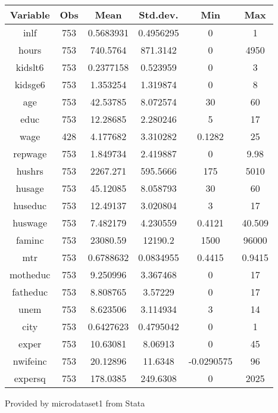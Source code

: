 \documentclass{article}
\begin{document}
\begin{Center}
	

	 \label{tab:title} 
	
	\begin{tabular}{|c |c |c |c |c |c |}
		\toprule
		Variable &Obs & Mean & Std.dev. & Min & Max \\ 
		\midrule
		inlf & 753 & 0.5683931 & 0.4956295 & 0 & 1\\
		hours & 753 & 740.5764 & 871.3142 & 0 & 4950 \\
		kidslt6 & 753 & 0.2377158 & 0.523959 & 0 & 3\\
		kidsge6 & 753 & 1.353254 & 1.319874 & 0 & 8\\
		age & 753 & 42.53785 & 8.072574 & 30 & 60\\
		educ & 753 & 12.28685 & 2.280246 & 5 & 17\\
		wage & 428 & 4.177682 & 3.310282  & 0.1282 & 25\\
		repwage & 753 & 1.849734 & 2.419887 & 0 & 9.98\\
		hushrs & 753 & 2267.271 & 595.5666 & 175 & 5010\\
		husage & 753 & 45.12085 & 8.058793 & 30 & 60\\
		huseduc & 753 & 12.49137 & 3.020804 & 3 & 17\\
		huswage & 753 & 7.482179 & 4.230559 & 0.4121 & 40.509\\
		faminc & 753 & 23080.59 & 12190.2 & 1500 & 96000\\
		mtr & 753 & 0.6788632 & 0.0834955 & 0.4415 & 0.9415\\
		motheduc & 753 & 9.250996 & 3.367468 & 0 & 17\\
		fatheduc & 753 & 8.808765 & 3.57229 & 0 & 17\\
		unem & 753 & 8.623506 & 3.114934 & 3 & 14\\
		city & 753 & 0.6427623 & 0.4795042 & 0 & 1\\
		exper & 753 & 10.63081 & 8.06913 & 0 & 45\\
		nwifeinc & 753 & 20.12896 & 11.6348 & -0.0290575 & 96\\
		expersq & 753 & 178.0385 & 249.6308 & 0 & 2025\\
		\bottomrule
		
	\end{tabular} \par
	
	Provided by microdataset1 from Stata

\end{Center}	
	
\end{document}
